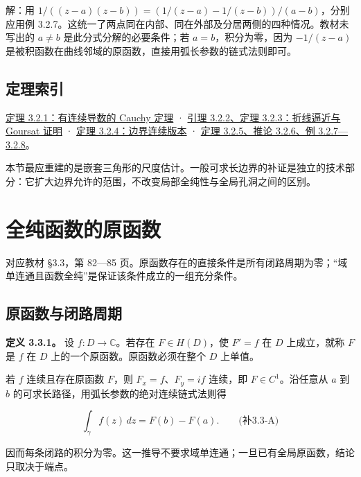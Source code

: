 \documentclass[11pt,a4paper]{article}
\begin{document}
解：用 \(1/((z-a)(z-b))=(1/(z-a)-1/(z-b))/(a-b)\)，分别应用例
3.2.7。这统一了两点同在内部、同在外部及分居两侧的四种情况。教材未写出的
\(a\ne b\) 是此分式分解的必要条件；若 \(a=b\)，积分为零，因为
\(-1/(z-a)\)
是被积函数在曲线邻域的原函数，直接用弧长参数的链式法则即可。

\subsection{定理索引}\label{ch03-s2-ux5b9aux7406ux7d22ux5f15}

\hyperref[ch03-s2-ux5b9aux7406ux7684ux6761ux4ef6ux4e0e-cauchy-ux539fux59cbux7248ux672c]{定理
3.2.1：有连续导数的 Cauchy 定理} ·
\hyperref[ch03-s2-ux6298ux7ebfux903cux8fd1ux4e0e-goursat-ux6784ux9020]{引理
3.2.2、定理 3.2.3：折线逼近与 Goursat 证明} ·
\hyperref[ch03-s2-ux8fb9ux754cux8fdeux7eedux7248ux672cux53caux5b8cux6574ux8865ux8bc1]{定理
3.2.4：边界连续版本} ·
\hyperref[ch03-s2-ux591aux8fdeux901aux57dfux65b9ux5411ux4e0eux57faux672cux5e94ux7528]{定理
3.2.5、推论 3.2.6、例 3.2.7---3.2.8}。

本节最应重建的是嵌套三角形的尺度估计。一般可求长边界的补证是独立的技术部分：它扩大边界允许的范围，不改变局部全纯性与全局孔洞之间的区别。

\section{全纯函数的原函数}
对应教材 §3.3，第 82---85
页。原函数存在的直接条件是所有闭路周期为零；``域单连通且函数全纯''是保证该条件成立的一组充分条件。

\subsection{原函数与闭路周期}\label{ch03-s3-ux539fux51fdux6570ux4e0eux95edux8defux5468ux671f}

\textbf{定义 3.3.1。} 设 \(f:D\to\mathbb C\)。若存在 \(F\in H(D)\)，使
\(F'=f\) 在 \(D\) 上成立，就称 \(F\) 是 \(f\) 在 \(D\)
上的一个原函数。原函数必须在整个 \(D\) 上单值。

若 \(f\) 连续且存在原函数 \(F\)，则 \(F_x=f\)、\(F_y=if\) 连续，即
\(F\in C^1\)。沿任意从 \(a\) 到 \(b\)
的可求长路径，用弧长参数的绝对连续链式法则得

\[
\int_\gamma f(z)\,dz=F(b)-F(a).
\qquad\text{(补3.3-A)}
\]

因而每条闭路的积分为零。这一推导不要求域单连通；一旦已有全局原函数，结论只取决于端点。
\end{document}
